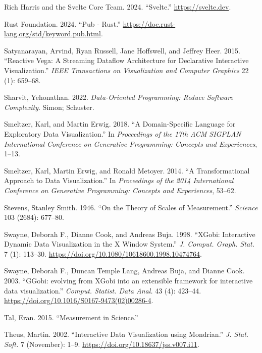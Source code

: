 \documentclass[
]{book}
\newlength{\cslhangindent}
\newenvironment{CSLReferences}[2] %
 {\begin{list}{}{%
  \setlength{\itemindent}{0pt}
  \setlength{\leftmargin}{0pt}
  \setlength{\parsep}{0pt}
  \ifodd #1
   \setlength{\leftmargin}{\cslhangindent}
   \setlength{\itemindent}{-1\cslhangindent}
  \fi
  \setlength{\itemsep}{#2\baselineskip}}}
 {\end{list}}
\theoremstyle{definition}
\theoremstyle{definition}
\theoremstyle{definition}
\theoremstyle{definition}
\theoremstyle{remark}
\begin{document}
\begin{CSLReferences}{1}{0}
Rich Harris and the Svelte Core Team. 2024. {``Svelte.''} \url{https://svelte.dev}.

Rust Foundation. 2024. {``Pub - Rust.''} \url{https://doc.rust-lang.org/std/keyword.pub.html}.

Satyanarayan, Arvind, Ryan Russell, Jane Hoffswell, and Jeffrey Heer. 2015. {``Reactive Vega: A Streaming Dataflow Architecture for Declarative Interactive Visualization.''} \emph{IEEE Transactions on Visualization and Computer Graphics} 22 (1): 659--68.

Sharvit, Yehonathan. 2022. \emph{Data-Oriented Programming: Reduce Software Complexity}. Simon; Schuster.

Smeltzer, Karl, and Martin Erwig. 2018. {``A Domain-Specific Language for Exploratory Data Visualization.''} In \emph{Proceedings of the 17th ACM SIGPLAN International Conference on Generative Programming: Concepts and Experiences}, 1--13.

Smeltzer, Karl, Martin Erwig, and Ronald Metoyer. 2014. {``A Transformational Approach to Data Visualization.''} In \emph{Proceedings of the 2014 International Conference on Generative Programming: Concepts and Experiences}, 53--62.

Stevens, Stanley Smith. 1946. {``On the Theory of Scales of Measurement.''} \emph{Science} 103 (2684): 677--80.

Swayne, Deborah F., Dianne Cook, and Andreas Buja. 1998. {``{XGobi: Interactive Dynamic Data Visualization in the X Window System}.''} \emph{J. Comput. Graph. Stat.} 7 (1): 113--30. \url{https://doi.org/10.1080/10618600.1998.10474764}.

Swayne, Deborah F., Duncan Temple Lang, Andreas Buja, and Dianne Cook. 2003. {``{GGobi: evolving from XGobi into an extensible framework for interactive data visualization}.''} \emph{Comput. Statist. Data Anal.} 43 (4): 423--44. \url{https://doi.org/10.1016/S0167-9473(02)00286-4}.

Tal, Eran. 2015. {``Measurement in Science.''}

Theus, Martin. 2002. {``{Interactive Data Visualization using Mondrian}.''} \emph{J. Stat. Soft.} 7 (November): 1--9. \url{https://doi.org/10.18637/jss.v007.i11}.


\end{CSLReferences}
\end{document}
